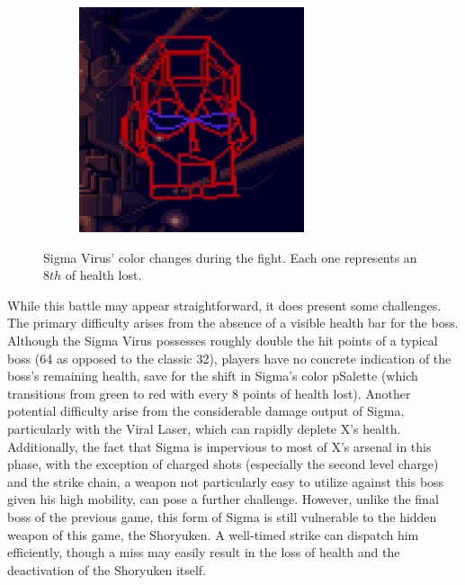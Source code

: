 \begin{figure}[htp]
\begin{subfigure}{0.3\linewidth}
	\end{subfigure}
	\begin{subfigure}{0.3\linewidth}
		\centering
		\includegraphics[width=\linewidth]{figures/X2/Hunter_stages/Sigma_virus_phase_7.png}
	\end{subfigure}
	\caption{Sigma Virus' color changes during the fight. Each one represents an $8th$ of health lost.}
\end{figure}
While this battle may appear straightforward, it does present some challenges. The primary difficulty arises from the absence of a visible health bar for the boss. Although the Sigma Virus possesses roughly double the hit points of a typical boss (64 as opposed to the classic 32), players have no concrete indication of the boss's remaining health, save for the shift in Sigma's color pSalette (which transitions from green to red with every 8 points of health lost). Another potential difficulty arise from the considerable damage output of Sigma, particularly with the Viral Laser, which can rapidly deplete X's health. Additionally, the fact that Sigma is impervious to most of X's arsenal in this phase, with the exception of charged shots (especially the second level charge) and the strike chain, a weapon not particularly easy to utilize against this boss given his high mobility, can pose a further challenge. However, unlike the final boss of the previous game, this form of Sigma is still vulnerable to the hidden weapon of this game, the Shoryuken. A well-timed strike can dispatch him efficiently, though a miss may easily result in the loss of health and the deactivation of the Shoryuken itself.


